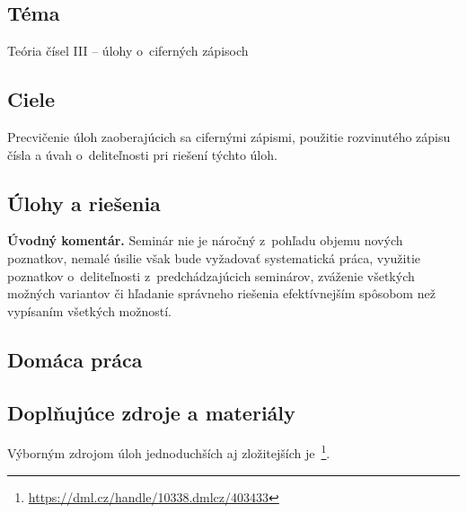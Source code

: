 
\subsection*{Téma}
Teória čísel III -- úlohy o~ciferných zápisoch
\subsection*{Ciele}
Precvičenie úloh zaoberajúcich sa cifernými zápismi, použitie rozvinutého zápisu čísla a úvah o~deliteľnosti pri riešení týchto úloh.

\subsection*{Úlohy a riešenia}


\textbf{Úvodný komentár.} Seminár nie je náročný z~pohľadu objemu nových poznatkov, nemalé úsilie však bude vyžadovať systematická práca, využitie poznatkov o~deliteľnosti z~predchádzajúcich seminárov, zváženie všetkých možných variantov či hľadanie správneho riešenia efektívnejším spôsobom než vypísaním všetkých možností.

















\subsection*{Domáca práca}






\subsection*{Doplňujúce zdroje a materiály}
Výborným zdrojom úloh jednoduchších aj zložitejších je~\cite{sedlacek1961}\footnote{\url{https://dml.cz/handle/10338.dmlcz/403433}}.

